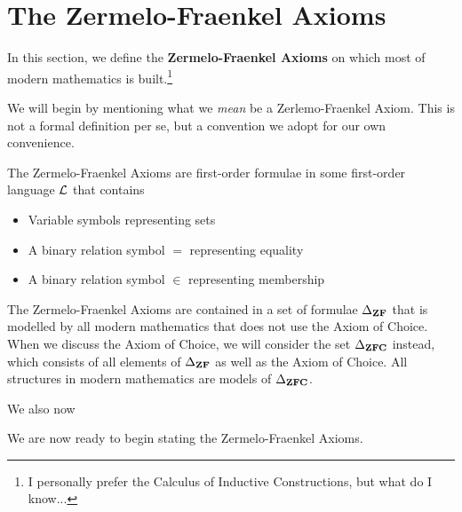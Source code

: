 \section{The Zermelo-Fraenkel Axioms}

In this section, we define the \textbf{Zermelo-Fraenkel Axioms} on which most of modern mathematics is built.\footnote{I personally prefer the Calculus of Inductive Constructions, but what do I know...}

We will begin by mentioning what we \textit{mean} be a Zerlemo-Fraenkel Axiom. This is not a formal definition per se, but a convention we adopt for our own convenience.

\begin{boxconvention}
    The Zermelo-Fraenkel Axioms are first-order formulae in some first-order language $\mathcal{L}$ that contains
    \begin{itemize}
        \item Variable symbols representing sets
        \item A binary relation symbol $=$ representing equality
        \item A binary relation symbol $\in$ representing membership
    \end{itemize}
    The Zermelo-Fraenkel Axioms are contained in a set of formulae $\Delta_{\mathbf{ZF}}$ that is modelled by all modern mathematics that does not use the Axiom of Choice. When we discuss the Axiom of Choice, we will consider the set $\Delta_{\mathbf{ZFC}}$ instead, which consists of all elements of $\Delta_{\mathbf{ZF}}$ as well as the Axiom of Choice. All structures in modern mathematics are models of $\Delta_{\mathbf{ZFC}}$.
\end{boxconvention}

We also now 


We are now ready to begin stating the Zermelo-Fraenkel Axioms.

\begin{baxiom}
    \sorry
\end{baxiom}

\begin{baxiom}
    \sorry
\end{baxiom}

\begin{baxiom}
    \sorry
\end{baxiom}

